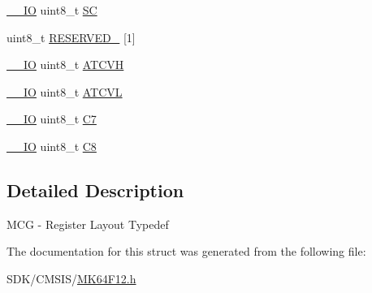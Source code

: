 \begin{DoxyCompactItemize}
\item 
\mbox{\hyperlink{core__cm4_8h_aec43007d9998a0a0e01faede4133d6be}{\+\_\+\+\_\+\+IO}} uint8\+\_\+t \mbox{\hyperlink{group___v_r_e_f___peripheral___access___layer_ga369ca7d5284929a823dab79b7d10d81f}{SC}}
\item 
uint8\+\_\+t \mbox{\hyperlink{group___v_r_e_f___peripheral___access___layer_ga83b2d6f5756a9b0aa609216190380d5f}{R\+E\+S\+E\+R\+V\+E\+D\+\_}} \mbox{[}1\mbox{]}
\item 
\mbox{\hyperlink{core__cm4_8h_aec43007d9998a0a0e01faede4133d6be}{\+\_\+\+\_\+\+IO}} uint8\+\_\+t \mbox{\hyperlink{group___v_r_e_f___peripheral___access___layer_ga168419f9fd3337173f29d6dde2133745}{A\+T\+C\+VH}}
\item 
\mbox{\hyperlink{core__cm4_8h_aec43007d9998a0a0e01faede4133d6be}{\+\_\+\+\_\+\+IO}} uint8\+\_\+t \mbox{\hyperlink{group___v_r_e_f___peripheral___access___layer_ga9659cfc372d5156510bdda5bb491fdbb}{A\+T\+C\+VL}}
\item 
\mbox{\hyperlink{core__cm4_8h_aec43007d9998a0a0e01faede4133d6be}{\+\_\+\+\_\+\+IO}} uint8\+\_\+t \mbox{\hyperlink{group___v_r_e_f___peripheral___access___layer_ga97f1c9dcf32bf6af23cd6b977e99d40f}{C7}}
\item 
\mbox{\hyperlink{core__cm4_8h_aec43007d9998a0a0e01faede4133d6be}{\+\_\+\+\_\+\+IO}} uint8\+\_\+t \mbox{\hyperlink{group___v_r_e_f___peripheral___access___layer_ga287edae47cc7c449d8ee31b6089559d4}{C8}}
\end{DoxyCompactItemize}


\subsection{Detailed Description}
M\+CG -\/ Register Layout Typedef 

The documentation for this struct was generated from the following file\+:\begin{DoxyCompactItemize}
\item 
S\+D\+K/\+C\+M\+S\+I\+S/\mbox{\hyperlink{_m_k64_f12_8h}{M\+K64\+F12.\+h}}\end{DoxyCompactItemize}
